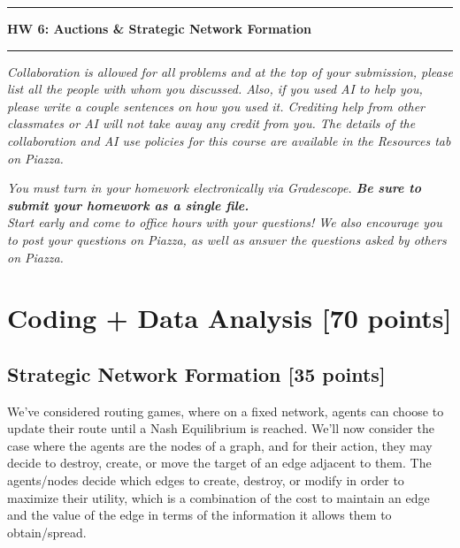 \documentclass[11pt]{article}
\begin{document}
\noindent \rule{\textwidth}{.5mm} \noindent {} \hfill {}

\noindent \centerline{\bf {\Large HW 6: Auctions \& Strategic Network Formation}}

\noindent {} \hfill
{} \noindent
\rule{\textwidth}{.5mm}



\noindent \textit{Collaboration is allowed for all problems and at the top of your submission, please list all the people
with whom you discussed. Also, if you used AI to help you, please write a couple sentences on how you used it. Crediting help from other classmates or AI will not take away any credit from you.
The details of the collaboration and AI use policies for this course are available in the Resources tab on Piazza.\\}


\noindent\textit{You must turn in your homework electronically via Gradescope. \textbf{Be sure to submit your homework as a single file.} }\\

\noindent\textit{Start early and come to office hours with your questions! We also encourage you to post your questions on Piazza, as well as answer the questions asked by others on Piazza.}


\section{Coding + Data Analysis [70 points]}

\subsection{Strategic Network Formation [35 points]}

We've considered routing games, where on a fixed network, agents can choose to update their route until a Nash Equilibrium is reached. We'll now consider the case where the agents are the nodes of a graph, and for their action, they may decide to destroy, create, or move the target of an edge adjacent to them. The agents/nodes decide which edges to create, destroy, or modify in order to maximize their utility, which is a combination of the cost to maintain an edge and the value of the edge in terms of the information it allows them to obtain/spread.
\end{document}
